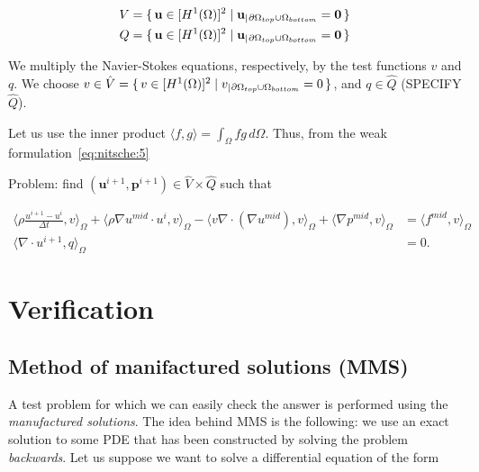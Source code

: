 \documentclass[11pt,a4paper,titlepage]{report}
\begin{document}
\begin{align*}
V &= \set{\mathbf{u} \in [H^1(\Omega)]^2 | \mathbf{u}_|{_{\partial \Omega_{top} \cup \Omega_{bottom}}} = \mathbf{0}} \\
Q &= \set{\mathbf{u} \in [H^1(\Omega)]^2 | \mathbf{u}_|{_{\partial \Omega_{top} \cup \Omega_{bottom}}} = \mathbf{0}}
\end{align*}



We multiply the Navier-Stokes equations, respectively, by the test functions $v$ and $q$. We choose $v \in \hat{V} = \set{v \in [H^1(\Omega)]^2 | v_|{_{\partial \Omega_{top} \cup \Omega_{bottom}}} = 0}$, and $q \in \hat{Q}$ (SPECIFY $\hat{Q}$).


Let us use the inner product $\langle f,g \rangle = \int_{\Omega} fg \, d\Omega$. Thus, from the weak formulation~\eqref{eq:nitsche:5}

Problem: find $(\mathbf{u}^{i+1}, \mathbf{p}^{i+1}) \in \hat{V} \times \hat{Q}$ such that

\begin{align}
\langle \rho \frac{u^{i+1} - u^i}{\Delta t},v \rangle_\Omega
+ \langle \rho \nabla u^{mid} \cdot u^i  ,v \rangle_\Omega
- \langle v \nabla \cdot (\nabla u^{mid}) ,v \rangle_\Omega
+ \langle \nabla p^{mid} ,v \rangle_\Omega & = \langle f^{mid} ,v \rangle_\Omega \\
\langle \nabla \cdot u^{i+1},q \rangle_\Omega &=0 .
\end{align}



\chapter{Verification}

\section{Method of manifactured solutions (MMS)}

A test problem for which we can easily check the answer is performed using the \textit{manufactured solutions}. The idea behind MMS is the following: we use an exact solution to some PDE that has been constructed by solving the problem \textit{backwards}. Let us suppose we want to solve a differential equation of the form
\end{document}

